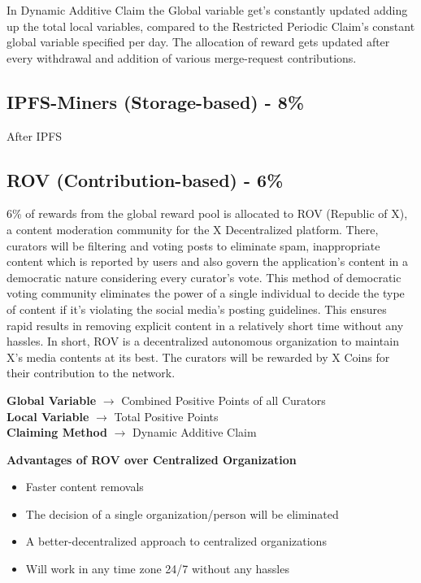 \documentclass[letterpaper,11pt]{article}
\begin{document}
In Dynamic Additive Claim the Global variable get's constantly updated adding up the total local variables, compared to the Restricted Periodic Claim's constant global variable specified per day.  The allocation of reward gets updated after every withdrawal and addition of various merge-request contributions. \\


\subsection{\textbf{IPFS-Miners (Storage-based) - 8\%}}

After IPFS\\

\subsection{\textbf{ROV (Contribution-based) - 6\%}}

6\% of rewards from the global reward pool is allocated to ROV (Republic of X), a content moderation community for the X Decentralized platform. There, curators will be filtering and voting posts to eliminate spam, inappropriate content which is reported by users and also govern the application's content in a democratic nature considering every curator's vote. This method of democratic voting community eliminates the power of a single individual to decide the type of content if it's violating the social media's posting guidelines. This ensures rapid results in removing explicit content in a relatively short time without any hassles. In short, ROV is a decentralized autonomous organization to maintain X's media contents at its best. The curators will be rewarded by X Coins for their contribution to the network.\\

\begin{center}
\textbf{Global Variable} $\to$ Combined Positive Points of all Curators\\
\vspace{2mm}
\textbf{Local Variable} $\to$ Total Positive Points\\
\vspace{2mm}
\textbf{Claiming Method} $\to$ Dynamic Additive Claim\\
\end{center}

\textbf{Advantages of ROV over Centralized Organization}
\begin{itemize}[wide, labelwidth=!, labelindent=0pt]
\item Faster content removals
\item The decision of a single organization/person will be eliminated
\item A better-decentralized approach to centralized organizations
\item Will work in any time zone 24/7 without any hassles
\end{itemize}
\end{document}
